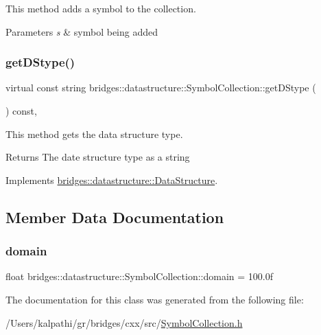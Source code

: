 This method adds a symbol to the collection. 


\begin{DoxyParams}{Parameters}
{\em s} & symbol being added \\
\hline
\end{DoxyParams}
\mbox{\label{classbridges_1_1datastructure_1_1_symbol_collection_a8f63c31a48a12127978967b706fc38f5}} 
\subsubsection{\texorpdfstring{getDStype()}{getDStype()}}
{\footnotesize\ttfamily virtual const string bridges\+::datastructure\+::\+Symbol\+Collection\+::get\+D\+Stype (\begin{DoxyParamCaption}{ }\end{DoxyParamCaption}) const\hspace{0.3cm}{\ttfamily [inline]}, {\ttfamily [virtual]}}



This method gets the data structure type. 

\begin{DoxyReturn}{Returns}
The date structure type as a string 
\end{DoxyReturn}


Implements \mbox{\hyperlink{classbridges_1_1datastructure_1_1_data_structure_a4ff66cb34409f11fe9fc647f6d8a22ce}{bridges\+::datastructure\+::\+Data\+Structure}}.



\subsection{Member Data Documentation}
\mbox{\label{classbridges_1_1datastructure_1_1_symbol_collection_a5e14cae08319875f60d6bdf7f8c880ab}} 
\subsubsection{\texorpdfstring{domain}{domain}}
{\footnotesize\ttfamily float bridges\+::datastructure\+::\+Symbol\+Collection\+::domain = 100.\+0f\hspace{0.3cm}{\ttfamily [protected]}}



The documentation for this class was generated from the following file\+:\begin{DoxyCompactItemize}
\item 
/\+Users/kalpathi/gr/bridges/cxx/src/\mbox{\hyperlink{_symbol_collection_8h}{Symbol\+Collection.\+h}}\end{DoxyCompactItemize}
